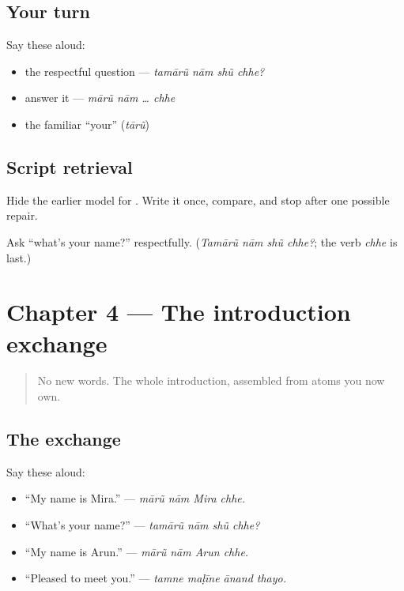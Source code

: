 \subsection*{Your turn}
Say these aloud:

\begin{itemize}
\raggedright
  \item the respectful question — \emph{tamārũ nām shũ chhe?}
  \item answer it — \emph{mārũ nām … chhe}
  \item the familiar \textquotedblleft{}your\textquotedblright{} (\emph{tārũ})
\end{itemize}

\subsection*{Script retrieval}
Hide the earlier model for \textbf{}. Write it once, compare, and stop after one possible repair.

\begin{tcolorbox}[breakable,colback=teal!4,colframe=teal!35!black,title={Before you move on}]
Ask \textquotedblleft{}what's your name?\textquotedblright{} respectfully. (\emph{Tamārũ nām shũ chhe?}; the verb \emph{chhe} is last.)
\end{tcolorbox}
\section[Practice]{Chapter 4 — The introduction exchange}

\label{lesson:GU-C02-practice}



\begin{quote}
No new words. The whole introduction, assembled from atoms you now own.
\end{quote}

\subsection*{The exchange}
Say these aloud:

\begin{itemize}
\raggedright
  \item \textquotedblleft{}My name is Mira.\textquotedblright{} — \emph{mārũ nām Mira chhe.}
  \item \textquotedblleft{}What's your name?\textquotedblright{} — \emph{tamārũ nām shũ chhe?}
  \item \textquotedblleft{}My name is Arun.\textquotedblright{} — \emph{mārũ nām Arun chhe.}
  \item \textquotedblleft{}Pleased to meet you.\textquotedblright{} — \emph{tamne maḷīne ānand thayo.}
\end{itemize}

